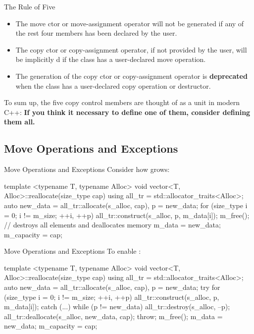 \begin{frame}{The Rule of Five}
  \begin{itemize}
    \item The move ctor or move-assignment operator will not be generated if any of the rest four members has been declared by the user.
    \item The copy ctor or copy-assignment operator, if not provided by the user, will be implicitly d if the class has a user-declared move operation.
    \item The generation of the copy ctor or copy-assignment operator is \textbf{deprecated} {\small{}} when the class has a user-declared copy operation or destructor.
  \end{itemize}
  To sum up, the five copy control members are thought of as a unit in modern C++: \textbf{If you think it necessary to define one of them, consider defining them all.}
\end{frame}

\subsection{Move Operations and Exceptions}

\begin{frame}[fragile]{Move Operations and Exceptions}
  Consider how  grows:
  \begin{cpp}[\scriptsize]
template <typename T, typename Alloc>
void vector<T, Alloc>::reallocate(size_type cap) {
  using all_tr = std::allocator_traits<Alloc>;
  auto new_data = all_tr::allocate(s_alloc, cap), p = new_data;
  for (size_type i = 0; i != m_size; ++i, ++p)
    all_tr::construct(s_alloc, p, m_data[i]);
  m_free(); // destroys all elements and deallocates memory
  m_data = new_data;
  m_capacity = cap;
}
  \end{cpp}
\end{frame}

\begin{frame}[fragile]{Move Operations and Exceptions}
  To enable :
  \begin{cpp}[\scriptsize]
template <typename T, typename Alloc>
void vector<T, Alloc>::reallocate(size_type cap) {
  using all_tr = std::allocator_traits<Alloc>;
  auto new_data = all_tr::allocate(s_alloc, cap), p = new_data;
  try {
    for (size_type i = 0; i != m_size; ++i, ++p)
      all_tr::construct(s_alloc, p, m_data[i]);
  } catch (...) {
    while (p != new_data)
      all_tr::destroy(s_alloc, --p);
    all_tr::deallocate(s_alloc, new_data, cap);
    throw;
  }
  m_free();
  m_data = new_data;
  m_capacity = cap;
}
  \end{cpp}
\end{frame}

